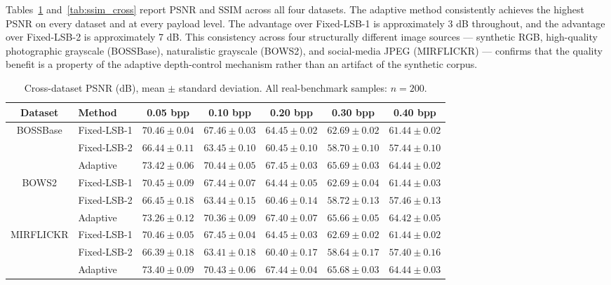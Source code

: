 Tables~\ref{tab:psnr_cross} and~\ref{tab:ssim_cross} report PSNR and SSIM across all four datasets. The adaptive method consistently achieves the highest PSNR on every dataset and at every payload level. The advantage over Fixed-LSB-1 is approximately 3 dB throughout, and the advantage over Fixed-LSB-2 is approximately 7 dB. This consistency across four structurally different image sources --- synthetic RGB, high-quality photographic grayscale (BOSSBase), naturalistic grayscale (BOWS2), and social-media JPEG (MIRFLICKR) --- confirms that the quality benefit is a property of the adaptive depth-control mechanism rather than an artifact of the synthetic corpus.

\begin{table}[H]
\centering
\caption{Cross-dataset PSNR (dB), mean $\pm$ standard deviation. All real-benchmark samples: $n = 200$.}
\label{tab:psnr_cross}
\begin{adjustbox}{max width=\textwidth}
\begin{tabular}{clccccc}
\toprule
Dataset & Method & 0.05 bpp & 0.10 bpp & 0.20 bpp & 0.30 bpp & 0.40 bpp \\
\midrule
\multirow{3}{*}{BOSSBase} & Fixed-LSB-1 & $70.46\pm0.04$ & $67.46\pm0.03$ & $64.45\pm0.02$ & $62.69\pm0.02$ & $61.44\pm0.02$ \\
                           & Fixed-LSB-2 & $66.44\pm0.11$ & $63.45\pm0.10$ & $60.45\pm0.10$ & $58.70\pm0.10$ & $57.44\pm0.10$ \\
                           & Adaptive    & $\mathbf{73.42\pm0.06}$ & $\mathbf{70.44\pm0.05}$ & $\mathbf{67.45\pm0.03}$ & $\mathbf{65.69\pm0.03}$ & $\mathbf{64.44\pm0.02}$ \\
\midrule
\multirow{3}{*}{BOWS2}     & Fixed-LSB-1 & $70.45\pm0.09$ & $67.44\pm0.07$ & $64.44\pm0.05$ & $62.69\pm0.04$ & $61.44\pm0.03$ \\
                           & Fixed-LSB-2 & $66.45\pm0.18$ & $63.44\pm0.15$ & $60.46\pm0.14$ & $58.72\pm0.13$ & $57.46\pm0.13$ \\
                           & Adaptive    & $\mathbf{73.26\pm0.12}$ & $\mathbf{70.36\pm0.09}$ & $\mathbf{67.40\pm0.07}$ & $\mathbf{65.66\pm0.05}$ & $\mathbf{64.42\pm0.05}$ \\
\midrule
\multirow{3}{*}{MIRFLICKR} & Fixed-LSB-1 & $70.46\pm0.05$ & $67.45\pm0.04$ & $64.45\pm0.03$ & $62.69\pm0.02$ & $61.44\pm0.02$ \\
                           & Fixed-LSB-2 & $66.39\pm0.18$ & $63.41\pm0.18$ & $60.40\pm0.17$ & $58.64\pm0.17$ & $57.40\pm0.16$ \\
                           & Adaptive    & $\mathbf{73.40\pm0.09}$ & $\mathbf{70.43\pm0.06}$ & $\mathbf{67.44\pm0.04}$ & $\mathbf{65.68\pm0.03}$ & $\mathbf{64.44\pm0.03}$ \\
\bottomrule
\end{tabular}
\end{adjustbox}
\end{table}

